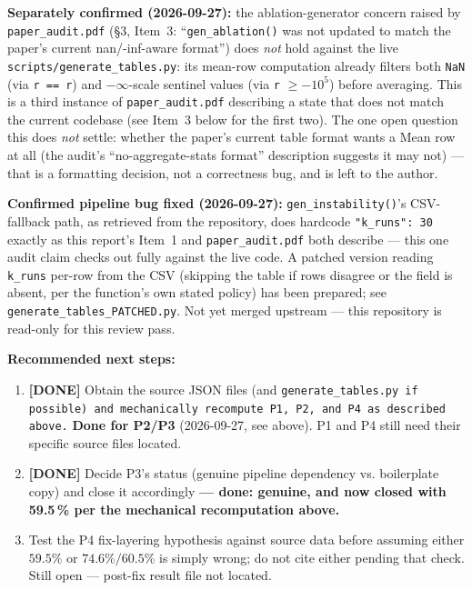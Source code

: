 \documentclass[11pt]{article}
\begin{document}
\textbf{Separately confirmed (2026-09-27):} the ablation-generator concern
raised by \texttt{paper\_audit.pdf} (\S3, Item~3: ``\texttt{gen\_ablation()}
was not updated to match the paper's current nan/-inf-aware format'') does
\emph{not} hold against the live \texttt{scripts/generate\_tables.py}:
its mean-row computation already filters both \texttt{NaN} (via
\texttt{r == r}) and $-\infty$-scale sentinel values (via \texttt{r} $\geq
-10^5$) before averaging. This is a third instance of
\texttt{paper\_audit.pdf} describing a state that does not match the
current codebase (see Item~3 below for the first two). The one open
question this does \emph{not} settle: whether the paper's current table
format wants a Mean row at all (the audit's ``no-aggregate-stats format''
description suggests it may not) --- that is a formatting decision, not a
correctness bug, and is left to the author.

\textbf{Confirmed pipeline bug fixed (2026-09-27):} \texttt{gen\_instability()}'s
CSV-fallback path, as retrieved from the repository, does hardcode
\texttt{"k\_runs": 30} exactly as this report's Item~1 and
\texttt{paper\_audit.pdf} both describe --- this one audit claim checks
out fully against the live code. A patched version reading \texttt{k\_runs}
per-row from the CSV (skipping the table if rows disagree or the field is
absent, per the function's own stated policy) has been prepared;
see \texttt{generate\_tables\_PATCHED.py}. Not yet merged upstream ---
this repository is read-only for this review pass.

\textbf{Recommended next steps:}
\begin{enumerate}
  \item \textbf{[DONE]} Obtain the source JSON files (and \texttt{generate\_tables.py
    if possible) and mechanically recompute P1, P2, and P4 as described
    above.} \textbf{Done for P2/P3} (2026-09-27, see above). P1 and P4 still
    need their specific source files located.
  \item \textbf{[DONE]} Decide P3's status (genuine pipeline dependency vs. boilerplate
    copy) and close it accordingly\textbf{ --- done: genuine, and now closed
    with 59.5\,\% per the mechanical recomputation above.}
  \item Test the P4 fix-layering hypothesis against source data before
    assuming either $59.5\%$ or $74.6\%/60.5\%$ is simply wrong; do not
    cite either pending that check. Still open --- post-fix result file not
    located.
\end{enumerate}
\end{document}
